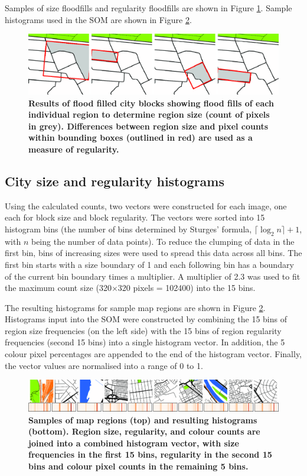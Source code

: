 \documentclass[9pt,twocolumn,twoside,lineno]{pnas-new}
\begin{document}
{Samples of size floodfills and regularity floodfills are shown in Figure \ref{fig:floodfilled}. Sample histograms used in the SOM are shown in Figure \ref{fig:mapsandHist}.

\begin{figure}
\centering
 \includegraphics[width=.8\linewidth]{BlockTypologies_Figures2-5.png}
\caption{\bf Results of flood filled city blocks showing flood fills of each individual region to determine region size (count of pixels in grey). Differences between region size and pixel counts within bounding boxes (outlined in red) are used as a measure of regularity.}
 \label{fig:floodfilled}
\end{figure} 

\subsection*{City size and regularity histograms}\label{methodshist}

Using the calculated counts, two vectors were constructed for each image, one each for block size and block regularity. The vectors were sorted into 15 histogram bins (the number of bins determined by Sturges' formula\cite{Sturges1926}, $\lceil \log_{2}n \rceil +1$, with $n$ being the number of data points). To reduce the clumping of data in the first bin, bins of increasing sizes were used to spread this data across all bins. The first bin starts with a size boundary of 1 and each following bin has a boundary of the current bin boundary times a multiplier. A multiplier of 2.3 was used to fit the maximum count size (320$\times$320 pixels = 102400) into the 15 bins.

The resulting histograms for sample map regions are shown in Figure \ref{fig:mapsandHist}. Histograms input into the SOM were constructed by combining the 15 bins of region size frequencies (on the left side) with the 15 bins of region regularity frequencies (second 15 bins) into a single histogram vector. In addition, the 5 colour pixel percentages are appended to the end of the histogram vector. Finally, the vector values are normalised into a range of 0 to 1.


\begin{figure}
\centering
 \includegraphics[width=.8\linewidth]{BlockTypologies_Figures2-6.png}
\caption{\bf Samples of map regions (top) and resulting histograms (bottom). Region size, regularity, and colour counts are joined into a combined histogram vector, with size frequencies in the first 15 bins, regularity in the second 15 bins and colour pixel counts in the remaining 5 bins.}
 \label{fig:mapsandHist}
\end{figure} 

}
\end{document}
